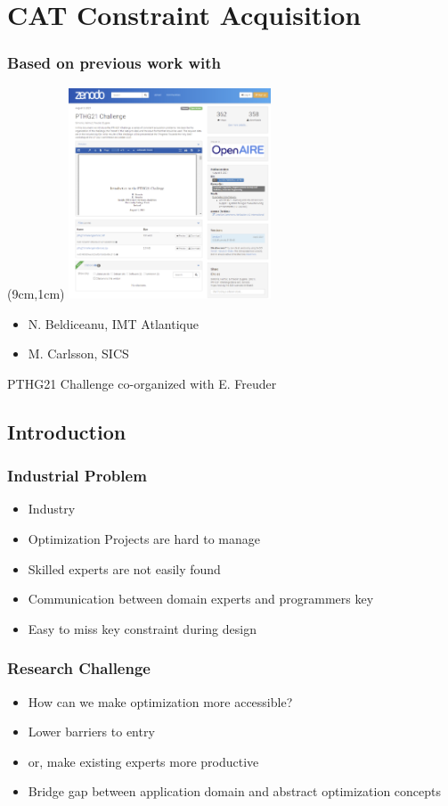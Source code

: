 \section{CAT Constraint Acquisition}

\begin{frame}
\frametitle{Based on previous work with}
\begin{textblock*}{6cm}(9cm,1cm)
\includegraphics[width=6cm]{imagescat/zenodo.png}
\end{textblock*}

\begin{itemize}
\item N. Beldiceanu, IMT Atlantique
\item M. Carlsson, SICS
\end{itemize}
\vspace{2cm}
PTHG21 Challenge co-organized with E. Freuder
\end{frame}

\subsection{Introduction}

\begin{frame}
\frametitle{Industrial Problem}
\begin{itemize}
\item Industry
\item Optimization Projects are hard to manage
\item Skilled experts are not easily found
\item Communication between domain experts and programmers key
\item Easy to miss key constraint during design 
\end{itemize}
\end{frame}

\begin{frame}
\frametitle{Research Challenge}
\begin{itemize}
\item How can we make optimization more accessible?
\item Lower barriers to entry
\item or, make existing experts more productive
\item Bridge gap between application domain and abstract optimization concepts
\end{itemize}
\end{frame}

